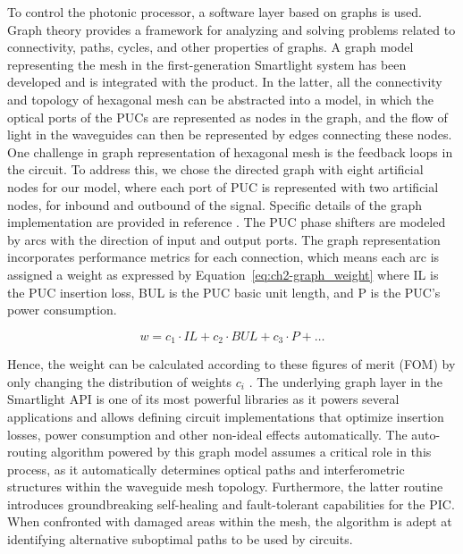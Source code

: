 To control the photonic processor, a software layer based on graphs is used.
Graph theory \cite{kerchove_automated_2023} provides a framework for analyzing and solving problems related to connectivity, paths, cycles, and other properties of graphs.
A graph model representing the mesh in the first-generation Smartlight system has been developed and is integrated with the product.
In the latter, all the connectivity and topology of hexagonal mesh can be abstracted into a model, in which the optical ports of the PUCs are represented as nodes in the graph, and the flow of light in the waveguides can then be represented by edges connecting these nodes.
One challenge in graph representation of hexagonal mesh is the feedback loops in the circuit.
To address this, we chose the directed graph with eight artificial nodes \cite{chen_graph_2020} for our model, where each port of PUC is represented with two artificial nodes, for inbound and outbound of the signal.
Specific details of the graph implementation are provided in reference \cite{xie_software-defined_2024}.
The PUC phase shifters are modeled by arcs with the direction of input and output ports.
The graph representation incorporates performance metrics for each connection, which means each arc is assigned a weight as expressed by Equation~\eqref{eq:ch2-graph_weight} where IL is the PUC insertion loss, BUL is the PUC basic unit length, and P is the PUC's power consumption.

\begin{equation}
	w = c_1 \cdot \textit{IL} + c_2 \cdot \textit{BUL} + c_3 \cdot P + \dots
	\label{eq:ch2-graph_weight}
\end{equation}

Hence, the weight can be calculated according to these figures of merit (FOM) by only changing the distribution of weights \(c_i\) \cite{lopez_auto-routing_2020}.
The underlying graph layer in the Smartlight API is one of its most powerful libraries as it powers several applications and allows defining circuit implementations that optimize insertion losses, power consumption and other non-ideal effects automatically.
The auto-routing algorithm powered by this graph model assumes a critical role in this process, as it automatically determines optical paths and interferometric structures within the waveguide mesh topology.
Furthermore, the latter routine introduces groundbreaking self-healing and fault-tolerant capabilities for the PIC.
When confronted with damaged areas within the mesh, the algorithm is adept at identifying alternative suboptimal paths to be used by circuits.

